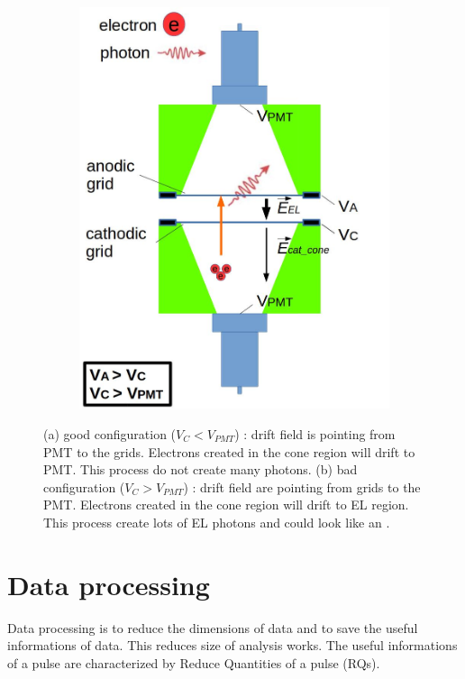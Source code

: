 \begin{figure}[!p]
\begin{subfigure}[b]{\halfwidth}
   \includegraphics[width=\figurewidth,clip,trim={0 0 0 0}]{Figures/GasTest/WeiDrawEvent/BadConfig.jpg}
   \caption{}
   \label{fig:BelowCathodeIllustration:BadConfig}
 \end{subfigure}
 \caption[\gtest\ good and bad voltage configurations]{(a) good configuration ($V_{C} < V_{PMT}$) : drift field is pointing from PMT to the grids. Electrons created in the cone region will drift to PMT. This process do not create many photons. (b) bad configuration  ($V_{C} > V_{PMT}$) : drift field are pointing from grids to the PMT. Electrons created in the cone region will drift to EL region. This process create lots of EL photons and could look like an \eep .}
 \label{fig:BelowCathodeIllustration}
\end{figure}

\section{Data processing} %
Data processing is to reduce the dimensions of data and to save the useful informations of data. This reduces size of analysis works. The useful informations of a pulse are characterized by Reduce Quantities of a pulse (RQs).

